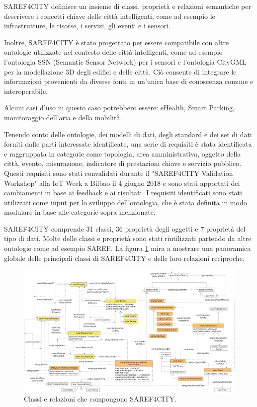 SAREF4CITY definisce un insieme di classi, proprietà e relazioni semantiche per
descrivere i concetti chiave delle città intelligenti, come ad esempio le
infrastrutture, le risorse, i servizi, gli eventi e i sensori.

Inoltre, SAREF4CITY è stato progettato per essere compatibile con altre
ontologie utilizzate nel contesto delle città intelligenti, come ad esempio
l'ontologia SSN (Semantic Sensor Network) per i sensori e l'ontologia CityGML
per la modellazione 3D degli edifici e delle città. Ciò consente di integrare
le informazioni provenienti da diverse fonti in un'unica base di conoscenza
comune e interoperabile.

Alcuni casi d'uso in questo caso potrebbero essere: eHealth, Smart Parking,
monitoraggio dell'aria e della mobilità.

Tenendo conto delle ontologie, dei modelli di dati, degli standard e dei set di
dati forniti dalle parti interessate identificate, una serie di requisiti è
stata identificata e raggruppata in categorie come topologia, area
amministrativa, oggetto della città, evento, misurazione, indicatore di
prestazioni chiave e servizio pubblico. Questi requisiti sono stati convalidati
durante il "SAREF4CITY Validation Workshop" alla IoT Week a Bilbao il 4 giugno
2018 e sono stati apportati dei cambiamenti in base ai feedback e ai risultati.
I requisiti identificati sono stati utilizzati come input per lo sviluppo
dell'ontologia, che è stata definita in modo modulare in base alle categorie
sopra menzionate.

SAREF4CITY comprende 31 classi, 36 proprietà degli oggetti e 7 proprietà del
tipo di dati. Molte delle classi e proprietà sono stati riutilizzati partendo
da altre ontologie come ad esempio SAREF. La figura \ref{fig:saref4city} mira a
mostrare una panoramica globale delle principali classi di SAREF4CITY e delle
loro relazioni reciproche.

\begin{figure}[!ht]
      \centering
      \includegraphics[width=13cm]{figures/saref4city.png}
      \caption{Classi e relazioni che compongono SAREF4CITY.}
      \label{fig:saref4city}
\end{figure}